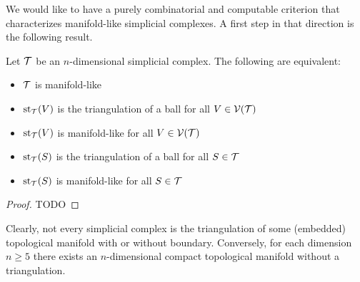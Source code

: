 \documentclass[a4paper]{amsart}
\begin{document}
We would like to have a purely combinatorial and computable criterion that characterizes manifold-like simplicial complexes. A first step in that direction is the following result.

\begin{lemma}\label{lemma:characterizationofmanifoldcomplexes}
    Let ${\mathcal T}$ be an $n$-dimensional simplicial complex. The following are equivalent:
    \begin{itemize}
     \item ${\mathcal T}$ is manifold-like
     \item $\operatorname{st}_{{\mathcal T}}(V)$ is the triangulation of a ball for all $V \in {\mathcal V}({\mathcal T})$
     \item $\operatorname{st}_{{\mathcal T}}(V)$ is manifold-like for all $V \in {\mathcal V}({\mathcal T})$
     \item $\operatorname{st}_{{\mathcal T}}(S)$ is the triangulation of a ball for all $S \in {\mathcal T}$
     \item $\operatorname{st}_{{\mathcal T}}(S)$ is manifold-like for all $S \in {\mathcal T}$
    \end{itemize}
\end{lemma}
\begin{proof}
    \color{red} TODO
\end{proof}



\begin{remark}
    Clearly, not every simplicial complex is the triangulation of some (embedded) topological manifold with or without boundary. 
    Conversely, for each dimension $n \geq 5$ there exists an $n$-dimensional compact topological manifold without a triangulation. %
\end{remark}
\end{document}
